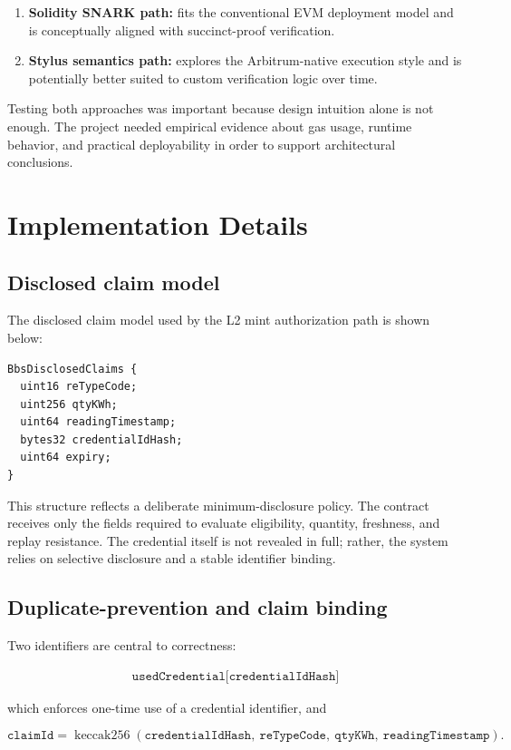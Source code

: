 \documentclass[11pt]{article}
\begin{document}
\begin{enumerate}
  \item \textbf{Solidity SNARK path:} fits the conventional EVM deployment model and is conceptually aligned with succinct-proof verification.
  \item \textbf{Stylus semantics path:} explores the Arbitrum-native execution style and is potentially better suited to custom verification logic over time.
\end{enumerate}

Testing both approaches was important because design intuition alone is not enough. The project needed empirical evidence about gas usage, runtime behavior, and practical deployability in order to support architectural conclusions.

\section{Implementation Details}

\subsection{Disclosed claim model}
The disclosed claim model used by the L2 mint authorization path is shown below:

\begin{verbatim}
BbsDisclosedClaims {
  uint16 reTypeCode;
  uint256 qtyKWh;
  uint64 readingTimestamp;
  bytes32 credentialIdHash;
  uint64 expiry;
}
\end{verbatim}

This structure reflects a deliberate minimum-disclosure policy. The contract receives only the fields required to evaluate eligibility, quantity, freshness, and replay resistance. The credential itself is not revealed in full; rather, the system relies on selective disclosure and a stable identifier binding.

\subsection{Duplicate-prevention and claim binding}
Two identifiers are central to correctness:

\begin{align*}
\texttt{usedCredential[credentialIdHash]} 
\end{align*}

which enforces one-time use of a credential identifier, and

\[
\texttt{claimId} = \operatorname{keccak256}(\texttt{credentialIdHash},\ \texttt{reTypeCode},\ \texttt{qtyKWh},\ \texttt{readingTimestamp}).
\]
\end{document}
